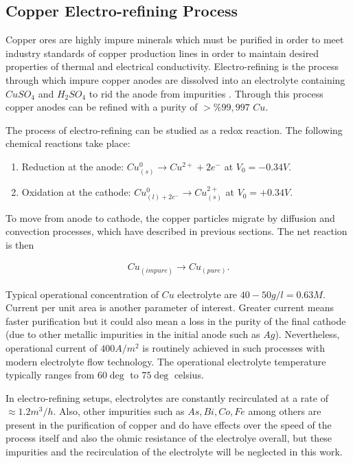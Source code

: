 \subsection{Copper Electro-refining Process}

Copper ores are highly impure minerals which must be purified in order to meet industry standards of copper production lines in order to maintain desired properties of thermal and electrical conductivity. Electro-refining is the process through which impure copper anodes are dissolved into an electrolyte containing $CuSO_4$ and $H_2SO_4$ to rid the anode from impurities \cite{schlesinger}. Through this process copper anodes can be refined with a purity of $>\%99,997$ $Cu$.


The process of electro-refining can be studied as a redox reaction. The following chemical reactions take place:
\begin{enumerate}
	\item Reduction at the anode: $Cu^0_{(s)} \rightarrow Cu^{2+} + 2e^-$ at $V_0 = -0.34V$.
	\item Oxidation at the cathode: $Cu^0_{(l) + 2e^-} \rightarrow Cu^{2+}_{(s)} $ at $V_0 = +0.34V$.
\end{enumerate}

To move from anode to cathode, the copper particles migrate by diffusion and convection processes, which have described in previous sections. The net reaction is then

\begin{align}
	Cu_{(impure)} \rightarrow Cu_{(pure)}.
\end{align}

Typical operational concentration of $Cu$ electrolyte are $40-50 g/l = 0.63 M$\cite{schlesinger}. Current per unit area is another parameter of interest. Greater current means faster purification but it could also mean a loss in the purity of the final cathode (due to other metallic impurities in the initial anode such as $Ag$). Nevertheless, operational current of $400 A/m^2$ is routinely achieved in such processes with modern electrolyte flow technology. The operational electrolyte temperature typically ranges from $60\deg$ to $75\deg$ celsius.

In electro-refining setups, electrolytes are constantly recirculated at a rate of $\approx 1.2 m^3/h$. Also, other impurities such as $As, Bi, Co, Fe$ among others are present in the purification of copper and do have effects over the speed of the process itself and also the ohmic resistance of the electrolye overall, but these impurities and the recirculation of the electrolyte will be neglected in this work. 


